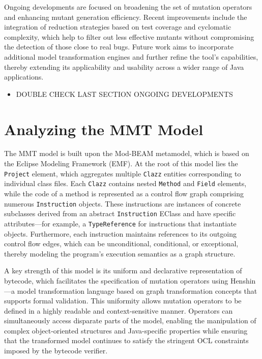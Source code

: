 \documentclass[12pt,a4paper]{article}
\begin{document}
Ongoing developments are focused on broadening the set of mutation operators
and enhancing mutant generation efficiency. Recent improvements include the
integration of reduction strategies based on test coverage and cyclomatic
complexity, which help to filter out less effective mutants without
compromising the detection of those close to real bugs. Future work aims to
incorporate additional model transformation engines and further refine the
tool's capabilities, thereby extending its applicability and usability across
a wider range of Java applications.

\begin{itemize}
	\item DOUBLE CHECK LAST SECTION ONGOING DEVELOPMENTS
\end{itemize}

\newpage
\section{Analyzing the MMT Model}

The MMT model is built upon the Mod-BEAM metamodel, which is based on the
Eclipse Modeling Framework (EMF). At the root of this model lies the
\texttt{Project} element, which aggregates multiple \texttt{Clazz} entities
corresponding to individual class files. Each \texttt{Clazz} contains nested
\texttt{Method} and \texttt{Field} elements, while the code of a method is
represented as a control flow graph comprising numerous \texttt{Instruction}
objects. These instructions are instances of concrete subclasses derived from
an abstract \texttt{Instruction} EClass and have specific attributes—for
example, a \texttt{TypeReference} for instructions that instantiate objects.
Furthermore, each instruction maintains references to its outgoing control
flow edges, which can be unconditional, conditional, or exceptional, thereby
modeling the program's execution semantics as a graph structure.

A key strength of this model is its uniform and declarative representation of
bytecode, which facilitates the specification of mutation operators using
Henshin—a model transformation language based on graph transformation
concepts that supports formal validation. This uniformity allows mutation
operators to be defined in a highly readable and context-sensitive manner.
Operators can simultaneously access disparate parts of the model, enabling
the manipulation of complex object-oriented structures and Java-specific
properties while ensuring that the transformed model continues to satisfy the
stringent OCL constraints imposed by the bytecode verifier.
\end{document}
